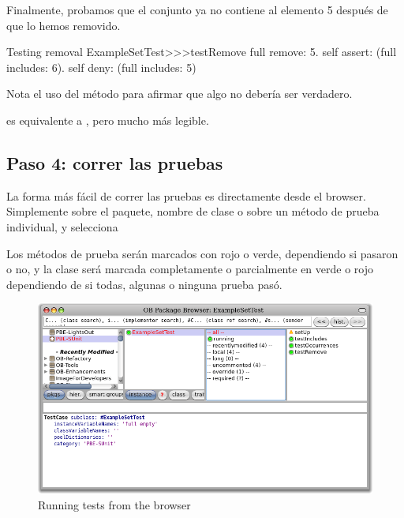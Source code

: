 \documentclass[a4paper,10pt,twoside]{book}
\begin{document}
Finalmente, probamos que el conjunto ya no contiene al elemento 5 despu\'es de que lo hemos removido.

\begin{method}[testRemove]{Testing removal}
ExampleSetTest>>>testRemove
	full remove: 5.
	self assert: (full includes: 6).
	self deny: (full includes: 5)
\end{method}

\noindent

Nota el uso del m\'etodo  para afirmar que algo no deber\'ia ser 
 verdadero.

 es equivalente a , pero mucho m\'as legible.
\subsection{Paso 4: correr las pruebas}

La forma m\'as f\'acil de correr las pruebas es directamente desde el browser.
Simplemente \actclick sobre el paquete, nombre de clase o sobre un m\'etodo de prueba individual, 
y selecciona 

Los m\'etodos de prueba ser\'an marcados con rojo o verde, dependiendo si pasaron o no, y la clase ser\'a marcada completamente o parcialmente en verde o rojo dependiendo de si todas, algunas o ninguna prueba pas\'o.

\begin{figure}[tbh]
  \begin{center}
	\includegraphics[width=\linewidth]{browser-tests}
	\caption{Running \sunit tests from the browser}
  \end{center}
\end{figure}
\end{document}
